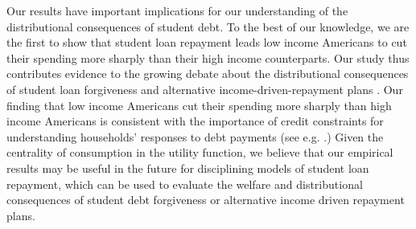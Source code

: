 \documentclass[12pt]{article}
\begin{document}
Our results have important implications for our understanding of the distributional consequences of student debt. 
To the best of our knowledge, we are the first to show that student loan repayment leads low income Americans to cut their spending more sharply than their high income counterparts. %
Our study thus contributes evidence to the growing debate about the distributional consequences of student loan forgiveness \citep{di2019second, Perry_et_al_brookings,catherine2023distributional} and alternative income-driven-repayment plans \citep{mueller2019rise, mueller2022increasing, herbst2023IDR, boutros_borrow_2022}. 
Our finding that low income Americans cut their spending more sharply than high income Americans is consistent with the importance of credit constraints for understanding households' responses to debt payments (see e.g. \citealp{boutros_borrow_2022}.) %
    Given the centrality of consumption in the utility function, we believe that our empirical results may be 
    useful in the future for disciplining models of student loan repayment, which can be used to evaluate the welfare and distributional consequences of student debt forgiveness or alternative income driven repayment plans. 

    
\end{document}
